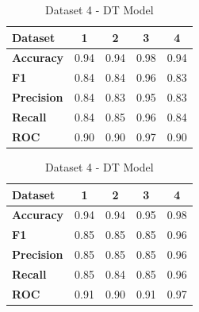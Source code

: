 \begin{table}[H]
\begin{subtable}[H]{0.45\textwidth}
    \centering
    \begin{tabular}{|l|c|c|c|c|}
      \hline
      \textbf{Dataset}   & \textbf{1} & \textbf{2} & \textbf{3} & \textbf{4} \\
      \hline
      \textbf{Accuracy}  & 0.94       & 0.94       & 0.98       & 0.94       \\
      \textbf{F1}        & 0.84       & 0.84       & 0.96       & 0.83       \\
      \textbf{Precision} & 0.84       & 0.83       & 0.95       & 0.83       \\
      \textbf{Recall}    & 0.84       & 0.85       & 0.96       & 0.84       \\
      \textbf{ROC}       & 0.90       & 0.90       & 0.97       & 0.90       \\
      \hline
    \end{tabular}
    \caption{Dataset 3 - DT Model}\label{subtab:dataset_3_dt_model}
  \end{subtable}
  \quad
  \begin{subtable}[H]{0.45\textwidth}
    \centering
    \begin{tabular}{|l|c|c|c|c|}
      \hline
      \textbf{Dataset}   & \textbf{1} & \textbf{2} & \textbf{3} & \textbf{4} \\
      \hline
      \textbf{Accuracy}  & 0.94       & 0.94       & 0.95       & 0.98       \\
      \textbf{F1}        & 0.85       & 0.85       & 0.85       & 0.96       \\
      \textbf{Precision} & 0.85       & 0.85       & 0.85       & 0.96       \\
      \textbf{Recall}    & 0.85       & 0.84       & 0.85       & 0.96       \\
      \textbf{ROC}       & 0.91       & 0.90       & 0.91       & 0.97       \\
      \hline
    \end{tabular}
    \caption{Dataset 4 - DT Model}\label{subtab:dataset_4_dt_model}
  \end{subtable}
\end{table}

